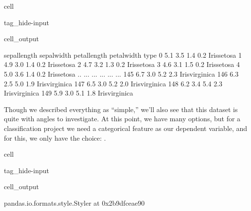 \documentclass[letterpaper,10pt,english]{jupyterBook}
\begin{document}
\begin{sphinxuseclass}{cell}
\begin{sphinxuseclass}{tag_hide-input}\begin{sphinxVerbatimOutput}

\begin{sphinxuseclass}{cell_output}
\begin{sphinxVerbatim}[commandchars=\\\{\}]
     sepal\PYGZhy{}length  sepal\PYGZhy{}width  petal\PYGZhy{}length  petal\PYGZhy{}width            type
0             5.1          3.5           1.4          0.2     Iris\PYGZhy{}setosa
1             4.9          3.0           1.4          0.2     Iris\PYGZhy{}setosa
2             4.7          3.2           1.3          0.2     Iris\PYGZhy{}setosa
3             4.6          3.1           1.5          0.2     Iris\PYGZhy{}setosa
4             5.0          3.6           1.4          0.2     Iris\PYGZhy{}setosa
..            ...          ...           ...          ...             ...
145           6.7          3.0           5.2          2.3  Iris\PYGZhy{}virginica
146           6.3          2.5           5.0          1.9  Iris\PYGZhy{}virginica
147           6.5          3.0           5.2          2.0  Iris\PYGZhy{}virginica
148           6.2          3.4           5.4          2.3  Iris\PYGZhy{}virginica
149           5.9          3.0           5.1          1.8  Iris\PYGZhy{}virginica
\end{sphinxVerbatim}

\end{sphinxuseclass}\end{sphinxVerbatimOutput}

\end{sphinxuseclass}
\end{sphinxuseclass}
\sphinxAtStartPar
Though we described everything as “simple,” we’ll also see that this dataset is quite  with angles to investigate. At this point, we have many options, but for a classification project we need a categorical feature as our dependent variable, and for this, we only have the choice: .

\begin{sphinxuseclass}{cell}
\begin{sphinxuseclass}{tag_hide-input}\begin{sphinxVerbatimOutput}

\begin{sphinxuseclass}{cell_output}
\begin{sphinxVerbatim}[commandchars=\\\{\}]
\PYGZlt{}pandas.io.formats.style.Styler at 0x2b9dfceae90\PYGZgt{}
\end{sphinxVerbatim}

\end{sphinxuseclass}\end{sphinxVerbatimOutput}

\end{sphinxuseclass}
\end{sphinxuseclass}
\begin{sphinxShadowBox}


\end{sphinxShadowBox}
\end{document}
